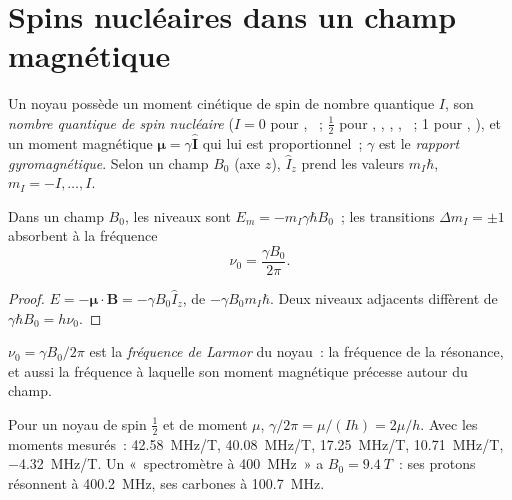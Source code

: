 \section{Spins nucléaires dans un champ magnétique}

\begin{definition}\label{def:b3:advanced-nmr:nuclear-spin}
Un noyau possède un moment cinétique de spin de nombre quantique $I$,
son \emph{nombre quantique de spin nucléaire} ($I = 0$
pour , ~; $\frac12$ pour , , , ,
~; 1 pour , ), et un moment magnétique $\boldsymbol\mu = \gamma\hat{\mathbf
I}$ qui lui est proportionnel~; $\gamma$ est le \emph{rapport gyromagnétique}.
Selon un champ $B_0$ (axe $z$), $\hat I_z$ prend les valeurs $m_I\hbar$,
$m_I = -I, \dots, I$.
\end{definition}

\begin{proposition}\label{prop:b3:advanced-nmr:zeeman}
Dans un champ $B_0$, les niveaux sont $E_m = -m_I\gamma\hbar B_0$~; les
transitions $\Delta m_I = \pm1$
absorbent à la fréquence
\[
\nu_0 = \frac{\gamma B_0}{2\pi}.
\]
\end{proposition}

\begin{proof}
$E = -\boldsymbol\mu\cdot\mathbf B = -\gamma B_0\hat I_z$, de  $-\gamma B_0m_I\hbar$. Deux niveaux adjacents
diffèrent de $\gamma\hbar B_0 = h\nu_0$.
\end{proof}

\begin{definition}\label{def:b3:advanced-nmr:larmor}
$\nu_0 = \gamma B_0/2\pi$ est la \emph{fréquence de Larmor} du
noyau~: la fréquence de la résonance, et aussi la fréquence à laquelle
son moment magnétique précesse autour du champ.
\end{definition}

\begin{example}\label{ex:b3:advanced-nmr:nuclei}
Pour un noyau de spin $\frac12$ et de moment $\mu$, $\gamma/2\pi = \mu/(Ih) = 2\mu/h$.
Avec les moments mesurés~:  \qty{42.58}{MHz/T},  \qty{40.08}{MHz/T}, 
\qty{17.25}{MHz/T},  \qty{10.71}{MHz/T},  \qty{-4.32}{MHz/T}. Un
«~spectromètre à \qty{400}{MHz}~» a $B_0 = \qty{9.4}{T}$~: ses protons
résonnent à
\qty{400.2}{MHz}, ses carbones à \qty{100.7}{MHz}.
\end{example}

